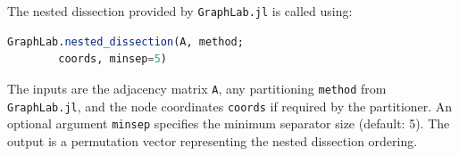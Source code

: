     
    


    

    The nested dissection provided by \texttt{GraphLab.jl} is called using:

    \begin{lstlisting}[language=Julia]
    GraphLab.nested_dissection(A, method; 
        coords, minsep=5)
    \end{lstlisting}

    The inputs are the adjacency matrix \texttt{A}, any partitioning \texttt{method} from \texttt{GraphLab.jl}, and the node coordinates \texttt{coords} if required by the partitioner. An optional argument \texttt{minsep} specifies the minimum separator size (default: 5). The output is a permutation vector representing the nested dissection ordering.
    
% 